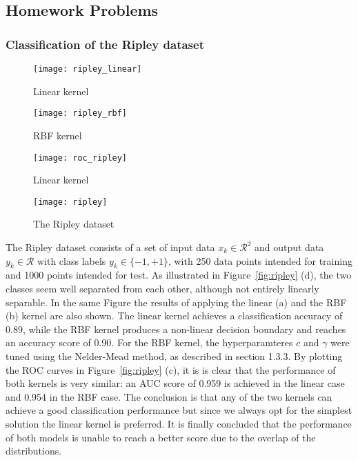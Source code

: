 \documentclass[conference,compsoc]{IEEEtran}
\begin{document}
\subsection{Homework Problems}
\subsubsection{Classification of the Ripley dataset}

\begin{figure*}[]
        \begin{subfigure}{0.45\linewidth}
            \texttt{[image: ripley\_linear]}
            \caption{Linear kernel}
        \end{subfigure}
        \begin{subfigure}{0.45\linewidth}
            \texttt{[image: ripley\_rbf]}
            \caption{RBF kernel}
        \end{subfigure}
        \centering
	   \begin{subfigure}{0.45\linewidth}
            \texttt{[image: roc\_ripley]}
            \caption{Linear kernel}
        \end{subfigure}
         \begin{subfigure}{0.45\linewidth}
            \texttt{[image: ripley]}
            \caption{The Ripley dataset}
        \end{subfigure}
                   
\caption{Classifying the Ripley dataset}        
        
             
        \label{fig:ripley}
    \end{figure*}
The Ripley dataset consists of a set of input data $x_k \in \mathcal{R}^2 $ and output data $y_k \in \mathcal{R} $ with class labels $y_k \in \{-1,+1 \}$, with 250 data points intended for training and 1000 points intended for test. As illustrated in Figure~\ref{fig:ripley} (d), the two classes seem well separated from each other, although not entirely linearly separable. In the same Figure the results of applying the linear (a) and the RBF (b) kernel are also shown. The linear kernel achieves a classification accuracy of 0.89, while the RBF kernel produces a non-linear decision boundary and reaches an accuracy score of 0.90. For the RBF kernel, the hyperparamteres $c$ and $\gamma$ were tuned using the Nelder-Mead method, as described in section 1.3.3. By plotting the ROC curves in Figure~\ref{fig:ripley} (c), it is is clear that the performance of both kernels is very similar: an AUC score of 0.959 is achieved in the linear case and 0.954 in the RBF case. The conclusion is that any of the two kernels can achieve a good classification performance but since we always opt for the simplest solution the linear kernel is preferred. It is finally concluded that the performance of both models is unable to reach a better score due to the overlap of the distributions.
\end{document}
